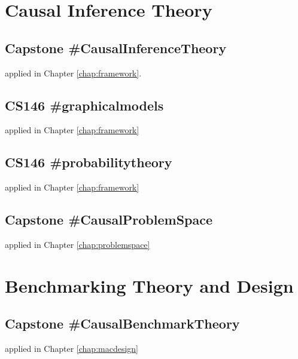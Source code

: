 \documentclass[../main.tex]{subfiles}
\begin{document}
\section{Causal Inference Theory}

\subsection*{\textbf{Capstone \#CausalInferenceTheory}}
\label{lo:CausalInferenceTheory}

applied in Chapter \ref{chap:framework}.


\subsection*{\textbf{CS146 \#graphicalmodels}}
\label{lo:graphicalmodels}

applied in Chapter \ref{chap:framework}


\subsection*{\textbf{CS146 \#probabilitytheory}}
\label{lo:probabilitytheory}

applied in Chapter \ref{chap:framework}


\subsection*{\textbf{Capstone \#CausalProblemSpace}}
\label{lo:CausalProblemSpace}

applied in Chapter \ref{chap:problemspace}


\section{Benchmarking Theory and Design}

\subsection*{\textbf{Capstone \#CausalBenchmarkTheory}}
\label{lo:CausalBenchmarkTheory}

applied in Chapter \ref{chap:macdesign}
\end{document}
